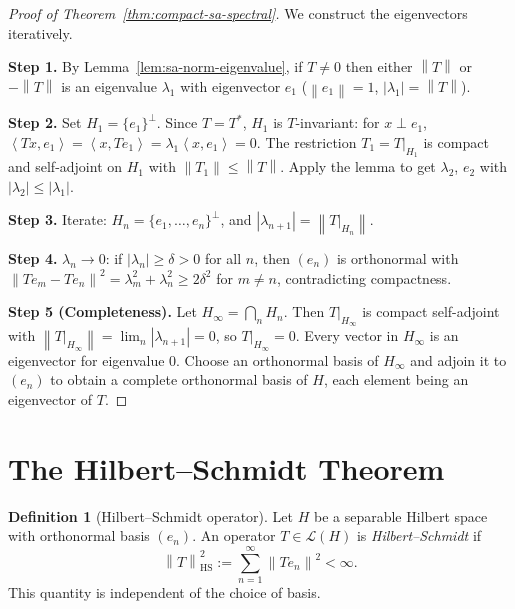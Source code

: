 \documentclass[a4paper,12pt]{book}
\newcommand{\norm}[1]{\left\| #1 \right\|}
\newcommand{\abs}[1]{\left| #1 \right|}
\newcommand{\inner}[2]{\left\langle #1, #2 \right\rangle}
\theoremstyle{definition}
\newtheorem{definition}{Definition}[chapter]
\theoremstyle{plain}
\theoremstyle{remark}
\begin{document}
\begin{proof}[Proof of Theorem~\ref{thm:compact-sa-spectral}]
We construct the eigenvectors iteratively.

\textbf{Step 1.} By Lemma~\ref{lem:sa-norm-eigenvalue}, if $T \ne 0$ then either
$\norm{T}$ or $-\norm{T}$ is an eigenvalue $\lambda_1$ with eigenvector $e_1$
($\norm{e_1} = 1$, $\abs{\lambda_1} = \norm{T}$).

\textbf{Step 2.} Set $H_1 = \{e_1\}^\perp$. Since $T = T^*$, $H_1$ is
$T$-invariant: for $x \perp e_1$,
$\inner{Tx}{e_1} = \inner{x}{Te_1} = \lambda_1\inner{x}{e_1} = 0$.
The restriction $T_1 = T|_{H_1}$ is compact and self-adjoint on $H_1$ with
$\norm{T_1} \le \norm{T}$. Apply the lemma to get $\lambda_2$, $e_2$ with
$\abs{\lambda_2} \le \abs{\lambda_1}$.

\textbf{Step 3.} Iterate: $H_n = \{e_1, \ldots, e_n\}^\perp$, and
$\abs{\lambda_{n+1}} = \norm{T|_{H_n}}$.

\textbf{Step 4.} $\lambda_n \to 0$: if $\abs{\lambda_n} \ge \delta > 0$ for all $n$,
then $(e_n)$ is orthonormal with
$\norm{Te_m - Te_n}^2 = \lambda_m^2 + \lambda_n^2 \ge 2\delta^2$ for $m \ne n$,
contradicting compactness.

\textbf{Step 5 (Completeness).} Let $H_\infty = \bigcap_n H_n$. Then $T|_{H_\infty}$
is compact self-adjoint with $\norm{T|_{H_\infty}} = \lim_n \abs{\lambda_{n+1}} = 0$,
so $T|_{H_\infty} = 0$. Every vector in $H_\infty$ is an eigenvector for
eigenvalue $0$. Choose an orthonormal basis of $H_\infty$ and adjoin it to
$(e_n)$ to obtain a complete orthonormal basis of $H$, each element being an
eigenvector of $T$.
\end{proof}


\section{The Hilbert--Schmidt Theorem}\label{sec:hilbert-schmidt}


\begin{definition}[Hilbert--Schmidt operator]\label{def:hilbert-schmidt}
Let $H$ be a separable Hilbert space with orthonormal basis $(e_n)$. An operator
$T \in \mathcal{L}(H)$ is \emph{Hilbert--Schmidt} if
\[
  \norm{T}_{\mathrm{HS}}^2 := \sum_{n=1}^\infty \norm{Te_n}^2 < \infty.
\]
This quantity is independent of the choice of basis.
\end{definition}
\end{document}
